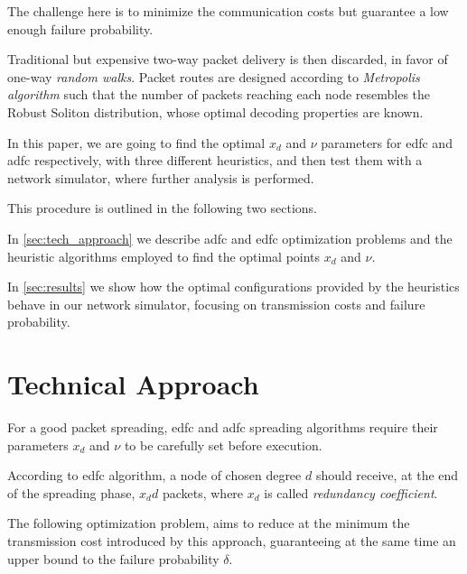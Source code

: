 \documentclass[12pt,journal,draftclsnofoot,onecolumn]{IEEEtran}
\begin{document}
The challenge here is to minimize the communication costs but guarantee a low enough failure probability.

Traditional but expensive \mbox{two-way} packet delivery is then discarded, in favor of \mbox{one-way} \emph{random walks}.
Packet routes are designed according to \emph{Metropolis algorithm} such that the number of packets reaching each node resembles the Robust Soliton distribution, whose optimal decoding properties are known\cite{Luby}.

In this paper, we are going to find the optimal $x_d$ and $\nu$ parameters for \gls{edfc} and \gls{adfc} respectively, with three different heuristics, and then test them with a network simulator, where further analysis is performed.

\smallbreak
This procedure is outlined in the following two sections.

In \autoref{sec:tech_approach} we describe \gls{adfc} and \gls{edfc} optimization problems and the heuristic algorithms employed to find the optimal points $x_d$ and $\nu$.

In \autoref{sec:results} we show how the optimal configurations provided by the heuristics behave in our network simulator, focusing on transmission costs and failure probability.

\section{Technical Approach}
\label{sec:tech_approach}
For a good packet spreading, \gls{edfc} and \gls{adfc} spreading algorithms require their parameters $x_d$ and $\nu$ to be carefully set before execution.

\smallbreak
According to \gls{edfc} algorithm, a node of chosen degree $d$ should receive, at the end of the spreading phase, $x_d d$ packets, where $x_d$ is called \emph{redundancy coefficient}.

The following optimization problem, aims to reduce at the minimum the transmission cost introduced by this approach, guaranteeing at the same time an upper bound to the failure probability $\delta$.\cite{Lin}
\end{document}
